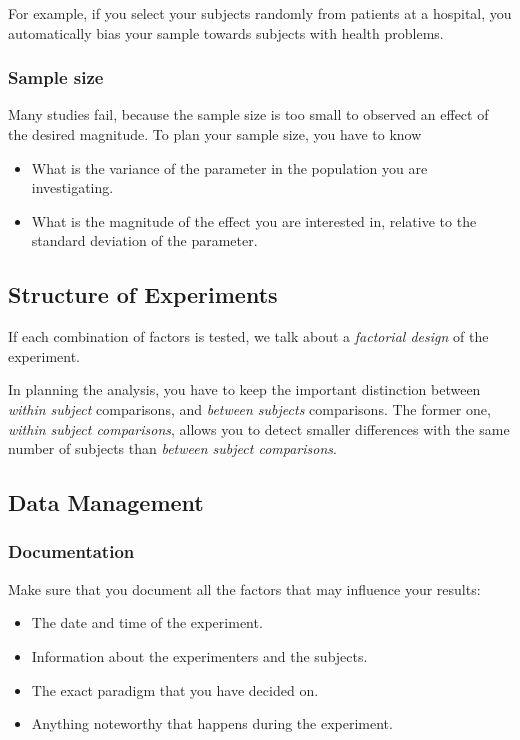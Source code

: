 For example, if you select your subjects randomly from patients at a hospital, you automatically bias your sample towards subjects with health problems.

\subsubsection{Sample size}
Many studies fail, because the sample size is too small to observed an effect of the desired magnitude. To plan your sample size, you have to know
\begin{itemize}
  \item What is the variance of the parameter in the population you are investigating.
  \item What is the magnitude of the effect you are interested in, relative to the standard deviation of the parameter.
\end{itemize}

\subsection{Structure of Experiments}

If each combination of factors is tested, we talk about a \emph{factorial design} of the experiment.

In planning the analysis, you have to keep the important distinction between \emph{within subject} comparisons, and \emph{between subjects} comparisons. The former one, \emph{within subject comparisons}, allows you to detect smaller differences with the same number of subjects than \emph{between subject comparisons}.


\subsection{Data Management}

\subsubsection{Documentation} 
Make sure that you document all the factors that may influence your results:

\begin{itemize}
  \item The date and time of the experiment.
  \item Information about the experimenters and the subjects.
  \item The exact paradigm that you have decided on.
  \item Anything noteworthy that happens during the experiment.
\end{itemize}

